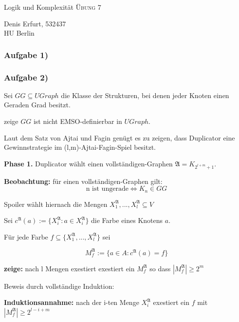 \documentclass[12pt]{article}
\begin{document}
\begin{center}
\Large
Logik und Komplexität  \textsc{ Übung 7 }
\end{center}

\begin{flushright}
Denis Erfurt, 532437\\
HU Berlin \\

\vspace{2 mm}

\end{flushright}

\subsubsection*{Aufgabe 1)}
\subsubsection*{Aufgabe 2)}
Sei $GG\subseteq UGraph$ die Klasse der Strukturen, bei denen jeder Knoten 
einen Geraden Grad besitzt. 

zeige $GG$ ist nicht EMSO-definierbar in $UGraph$.

Laut dem Satz von Ajtai und Fagin genügt es zu zeigen, dass Duplicator eine 
Gewinnstrategie im (l,m)-Ajtai-Fagin-Spiel besitzt.

\textbf{Phase 1.} Duplicator wählt einen vollständigen-Graphen $\mathfrak{A} = K_{2^{l+m}+1}$.

\textbf{Beobachtung:} für einen vollständigen-Graphen gilt:
  \[ \text{n ist ungerade} \Leftrightarrow K_n \in GG \] 
  
Spoiler wählt hiernach die Mengen $X_1^\mathfrak{A}, ..., X_l^\mathfrak{A} 
\subseteq V$

Sei $c^\mathfrak{A}(a) := \{ X_i^\mathfrak{A} : a\in X_i^\mathfrak{A} \}$ die
Farbe eines Knotens $a$. 

Für jede Farbe $f\subseteq \{ X_1^\mathfrak{A}, ..., X_l^\mathfrak{A} \}$ sei

\[ M_f^\mathfrak{A} := \{ a \in A : c^\mathfrak{A}(a) = f \} \] 

\textbf{zeige: } nach l Mengen exestiert exestiert ein $M_f^\mathfrak{A}$ so 
dass $|M_f^\mathfrak{A}| \geq 2^m$

  Beweis durch vollständige Induktion: 
  
  \textbf{Induktionsannahme:} nach der i-ten Menge $X_i^\mathfrak{A}$ exestiert
  ein $f$ mit $|M_f^\mathfrak{A}| \geq 2^{l-i+m}$
\end{document}

